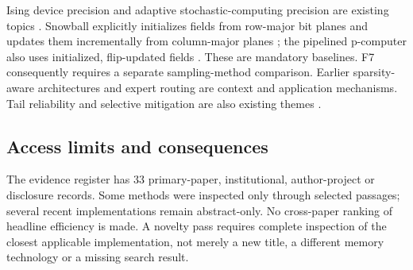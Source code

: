 Ising device precision and adaptive stochastic-computing precision are existing topics
\cite{S18,S19}. Snowball explicitly initializes fields from row-major bit planes and
updates them incrementally from column-major planes \cite{S32}; the pipelined p-computer
also uses initialized, flip-updated fields \cite{S33}. These are mandatory baselines.
F7 consequently requires a separate sampling-method comparison. Earlier
sparsity-aware architectures \cite{S26} and expert routing \cite{S27} are context and
application mechanisms. Tail reliability and selective mitigation are also existing
themes \cite{S25}.

\subsection{Access limits and consequences}

The evidence register has 33 primary-paper, institutional, author-project or disclosure
records. Some methods were inspected only through selected passages; several recent
implementations remain abstract-only. No cross-paper ranking of headline efficiency is
made. A novelty pass requires complete inspection of the closest applicable implementation,
not merely a new title, a different memory technology or a missing search result.
